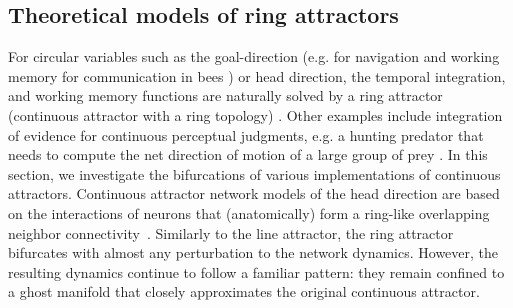 \documentclass{article} %
\newcounter{ct}
\theoremstyle{definition}
\theoremstyle{remark}
\begin{document}
\subsection{Theoretical models of ring attractors}\label{sec:ras}

For circular variables such as the goal-direction (e.g. for navigation \citep{sun2020decentralised, westeinde2024transforming} and working memory for communication in bees \citep{frisch1993dance}) %
or head direction, the temporal integration, and working memory functions are naturally solved by a ring attractor (continuous attractor with a ring topology) \citep{kim2017ring,kim2019generation,turner2017angular,turner2020neuroanatomical,hulse2020mechanisms,taube2003persistent,taube2007head,angelaki2020head,fisher2022flexible}.
Other examples include
integration of evidence for continuous perceptual judgments, e.g. a hunting predator that needs to compute the net direction of motion of a large group of prey \citep{esnaola2022flexible}.
In this section, we investigate the bifurcations of various implementations of continuous attractors.
Continuous attractor network models of the head direction are based on the interactions of neurons that (anatomically) form a ring-like overlapping neighbor connectivity~\citep{zhang1996,noorman2024accurate,ajabi2023,vafidis2022,boucheny2005continuous,knierim2012,song2005angular,xie2002double}.
Similarly to the line attractor, the ring attractor bifurcates with almost any perturbation to the network dynamics. However, the resulting dynamics continue to follow a familiar pattern: they remain confined to a ghost manifold that closely approximates the original continuous attractor.
\end{document}
